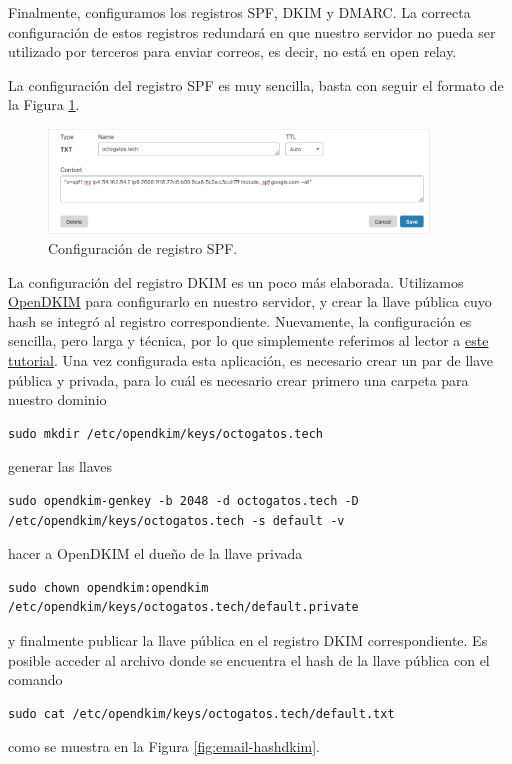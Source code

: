 \documentclass{article}
\begin{document}
Finalmente, configuramos los registros SPF, DKIM y DMARC.
La correcta configuraci\'on de estos registros redundar\'a
en que nuestro servidor no pueda ser utilizado por terceros
para enviar correos, es decir, no est\'a en open relay.

La configuraci\'on del registro SPF es muy sencilla, basta
con seguir el formato de la Figura \ref{fig:email-spf}.
\begin{figure}[H]
  \centering
  \includegraphics[width=0.9\textwidth]{email/spf}
  \caption{Configuraci\'on de registro SPF.}
  \label{fig:email-spf}
\end{figure}

La configuraci\'on del registro DKIM es un poco m\'as
elaborada.   Utilizamos \href{http://opendkim.org/}{OpenDKIM}
para configurarlo en nuestro servidor, y crear la llave
p\'ublica cuyo hash se integr\'o al registro
correspondiente.   Nuevamente, la configuraci\'on
es sencilla, pero larga y t\'ecnica, por lo que
simplemente referimos al lector a
\href{https://www.linuxbabe.com/mail-server/setting-up-dkim-and-spf}{este tutorial}. Una vez configurada esta
aplicaci\'on, es necesario crear un par de
llave p\'ublica y privada, para lo cu\'al es
necesario crear primero una carpeta para nuestro
dominio
\begin{lstlisting}
sudo mkdir /etc/opendkim/keys/octogatos.tech
\end{lstlisting}
generar las llaves
\begin{lstlisting}
sudo opendkim-genkey -b 2048 -d octogatos.tech -D /etc/opendkim/keys/octogatos.tech -s default -v
\end{lstlisting}
hacer a OpenDKIM el due\~no de la llave privada
\begin{lstlisting}
sudo chown opendkim:opendkim /etc/opendkim/keys/octogatos.tech/default.private
\end{lstlisting}
y finalmente publicar la llave p\'ublica en el registro
DKIM correspondiente.   Es posible acceder al archivo
donde se encuentra el hash de la llave p\'ublica con
el comando
\begin{lstlisting}
sudo cat /etc/opendkim/keys/octogatos.tech/default.txt
\end{lstlisting}
como se muestra en la Figura \ref{fig:email-hashdkim}.
\end{document}
